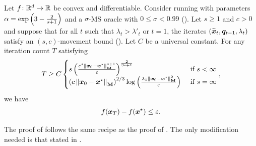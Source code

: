 \begin{theorem}
\label{thm:optimal_ms_acceleration}
Let $f\colon\mathbb{R}^d\rightarrow\mathbb{R}$ be convex and differentiable. Consider running  with parameters $\alpha = \mathrm{exp}\left(3-\frac{2}{s+1}\right)$ and a $\sigma$-MS oracle with $0 \le \sigma < 0.99$ (). Let $s\ge1$ and $c>0$ and suppose that for all $t$ such that $\lambda_t>\lambda'_t$ or $t=1$, the iterates $(\widetilde{\bm{x}}_t,\bm{q}_{t-1},\lambda_t)$ satisfy an $(s,c)$-movement bound (). Let $C$ be a universal constant. For any iteration count $T$ satisfying
\begin{align*}
    T \ge C\begin{cases} s\left(\frac{c^s\left\lVert \bm{x}_0-\bm{x}^{\star} \right\rVert_{\mathbf{M}}^{s+1}}{\varepsilon}\right)^{\frac{2}{3s+1}} & \text{ if } s < \infty \\ \left(c\left\lVert \bm{x}_0-\bm{x}^{\star} \right\rVert_{\mathbf{M}}\right)^{2/3}\log\left(\frac{\lambda_1\left\lVert \bm{x}_0-\bm{x}^{\star} \right\rVert_{\mathbf{M}}^2}{\varepsilon}\right) & \text{ if } s = \infty \end{cases},
\end{align*}
we have
\begin{align*}
    f(\bm{x}_T)-f(\bm{x}^{\star}) \le \varepsilon.
\end{align*}
\end{theorem}

The proof of  follows the same recipe as the proof of \cite[Theorem 1]{chjjs22}. The only modification needed is that stated in .

